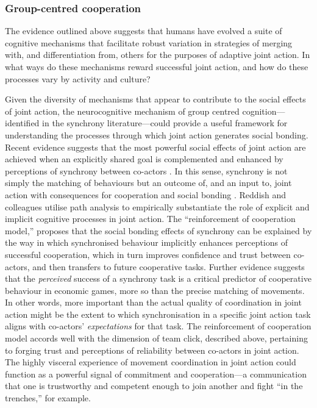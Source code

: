 \subsubsection{Group-centred cooperation}
The evidence outlined above suggests that humans have evolved a suite of cognitive mechanisms that facilitate robust variation in strategies of merging with, and differentiation from, others for the purposes of adaptive joint action. In what ways do these mechanisms reward successful joint action, and how do these processes vary by activity and culture?

Given the diversity of mechanisms that appear to contribute to the social effects of joint action, the neurocognitive mechanism of group centred cognition---identified in the synchrony literature---could provide a useful framework for understanding the processes through which joint action generates social bonding.  Recent evidence suggests that the most powerful social effects of joint action are achieved when an explicitly shared goal is complemented and enhanced by perceptions of synchrony between co-actors \citep{Frith2010,Reddish2013}.
In this sense, synchrony is not simply the matching of behaviours but an outcome of, and an input to, joint action with consequences for cooperation and social bonding \citep{Keller2014,Lumsden2012,Obhi2011}.
Reddish and colleagues \textcite{Reddish2013} utilise path analysis to empirically substantiate the role of explicit and implicit cognitive processes in joint action.
The ``reinforcement of cooperation model,'' proposes that the social bonding effects of synchrony can be explained by the way in which synchronised behaviour implicitly enhances perceptions of successful cooperation, which in turn improves confidence and trust between co-actors, and then transfers to future cooperative tasks.  Further evidence suggests that the \textit{perceived} success of a synchrony task is a critical predictor of cooperative behaviour in economic games, more so than the precise matching of movements\citep{Kurzban2001,Launay2013}.  In other words, more important than the actual quality of coordination in joint action might be the extent to which synchronisation in a specific joint action task aligns with co-actors' \textit{expectations} for that task.  The reinforcement of cooperation model accords well with the dimension of team click, described above, pertaining to forging trust and perceptions of reliability between co-actors in joint action.
The highly visceral experience of movement coordination in joint action could function as a powerful signal of commitment and cooperation---a communication that one is trustworthy and competent enough to join another and fight ``in the trenches,'' for example.

